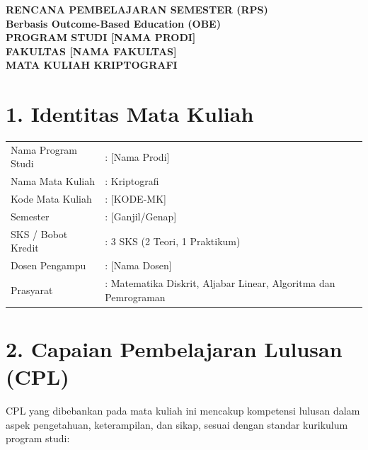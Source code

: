 \documentclass[12pt,a4paper]{article}
\begin{document}
\begin{center}
\textbf{\Large RENCANA PEMBELAJARAN SEMESTER (RPS)}\\
\textbf{Berbasis Outcome-Based Education (OBE)}\\[0.5cm]
\textbf{PROGRAM STUDI [NAMA PRODI]}\\
\textbf{FAKULTAS [NAMA FAKULTAS]}\\
\textbf{MATA KULIAH KRIPTOGRAFI}\\
\end{center}

\vspace{1cm}

\section*{1. Identitas Mata Kuliah}
\begin{tabular}{lp{10cm}}
Nama Program Studi & : [Nama Prodi] \\
Nama Mata Kuliah & : Kriptografi \\
Kode Mata Kuliah & : [KODE-MK] \\
Semester & : [Ganjil/Genap] \\
SKS / Bobot Kredit & : 3 SKS (2 Teori, 1 Praktikum) \\
Dosen Pengampu & : [Nama Dosen] \\
Prasyarat & : Matematika Diskrit, Aljabar Linear, Algoritma dan Pemrograman \\
\end{tabular}

\vspace{0.5cm}

\section*{2. Capaian Pembelajaran Lulusan (CPL)}

CPL yang dibebankan pada mata kuliah ini mencakup kompetensi lulusan dalam aspek pengetahuan, keterampilan, dan sikap, sesuai dengan standar kurikulum program studi:
\end{document}

